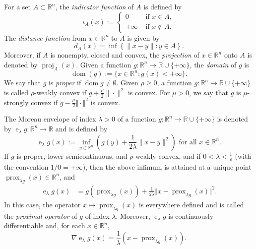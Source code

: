 \documentclass[11pt]{amsart}
\newcommand{\1}{\mathds{1}}
\theoremstyle{definition}
\theoremstyle{remark}
\theoremstyle{definition}
\newcommand{\R}{\mathbb{R}}
\newcommand{\MoreauYosida}[2]{\operatorname{e}_{#2} #1}
\newcommand{\Prox}[2]{\operatorname{prox}_{#2 #1}}
\begin{document}
\noindent For a set $A\subset \mathbb{R}^n$, the \emph{indicator function} of $A$ is defined by  
\begin{equation*}
\iota_A(x):=\left\{ \begin{array}{cc}
0 &\text{ if } x\in A,\\
+\infty &\text{ if } x\notin A.
\end{array}\right.
\end{equation*}
The \emph{distance function} from $x\in \mathbb{R}^n$  to $A$ is given by $$d_{A}(x)=\inf\left\{  \|  x - y\| : y\in A\right\}.$$
 Moreover, if $A$ is nonempty, closed and convex, the \emph{projection} of $x\in \mathbb{R}^n$ onto $A$ is denoted by $\operatorname{proj}_{A} (x)$. Given a function $g\colon \mathbb{R}^n \rightarrow \mathbb{R}\cup \{+\infty \}$, the \emph{domain} of $g$ is
\begin{equation*}
\operatorname{dom}(g):=\{x\in \mathbb{R}^n: g(x)<+\infty \}.
\end{equation*}
We say that $g$ is \emph{proper} if $\operatorname{dom}g\neq
\emptyset$. Given $\rho\geq 0$, a function $g\colon \R^n\to \mathbb{\R}\cup \{+\infty \}$ is called $\rho$-weakly convex if $g+\frac{\rho}{2}\|\cdot\|^2$ is convex. For $\mu>0$, we say that $g$ is $\mu$-strongly convex if $g-\frac{\mu}{2}\Vert \cdot\Vert^2$ is convex.

The Moreau envelope of index $\lambda>0$ of a function $g\colon \R^n\to \mathbb{R}\cup \{+\infty\}$ is denoted by $\MoreauYosida{g}{\lambda}\colon \mathbb{R}^n \to \mathbb{R}$ and is defined  by 
\begin{equation*}
    \MoreauYosida{g}{\lambda}(x):=\inf_{y\in \mathbb{R}^n} \left(	g(y) + \frac{1}{2\lambda } \|  x - y\|^2		\right) \textrm{ for all } x\in \mathbb{R}^n.
\end{equation*}
 If $g$ is proper, lower semicontinuous, and $\rho$-weakly convex, and if $0<\lambda<\frac{1}{\rho}$ (with the convention $1/0=+\infty$), then the above infimum is attained at a unique point $\Prox{g}{\lambda}(x)\in \mathbb{R}^n$, and
\begin{equation*}
\begin{aligned}
\MoreauYosida{g}{\lambda}(x)&=g(\Prox{g}{\lambda}(x))+\frac{1}{2\lambda}\Vert x-\Prox{g}{\lambda}(x)\Vert^2.
\end{aligned}
\end{equation*}
In this case, the operator $x\mapsto \Prox{g}{\lambda}(x)$ is everywhere defined and is called the \emph{proximal operator} of $g$ of index $\lambda$. Moreover, $\MoreauYosida{g}{\lambda}$ is continuously differentiable and, for each  $x\in \mathbb{R}^n$, 
\begin{equation*}
\nabla \MoreauYosida{g}{\lambda}(x)=\frac{1}{\lambda}(x-\Prox{g}{\lambda}(x)).
\end{equation*}
\end{document}
